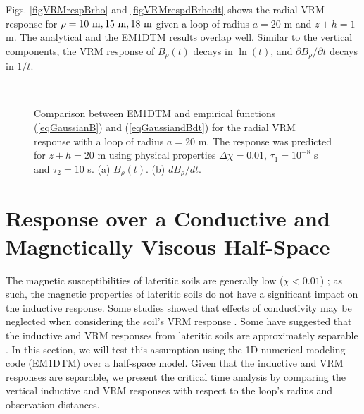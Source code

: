 \documentclass[journal]{IEEEtran}  %
\begin{document}
Figs. \ref{figVRMrespBrho} and
\ref{figVRMrespdBrhodt} shows the radial VRM response for $\rho = 10
~{\rm m}, 15 ~{\rm m}, 18 ~{\rm m}$ given a loop of radius $a=20$ m
and $z+h = 1$ m. The analytical and the EM1DTM results overlap well.
Similar to the vertical components, the VRM response of $B_\rho (t)$
decays in $\ln (t)$, and $\partial B_\rho /
\partial t$ decays in $1/t$.
\begin{figure}[!t]
    \centering
    \\
    \vspace{-10pt}
    \caption{Comparison between EM1DTM and
    empirical functions (\ref{eqGaussianB}) and (\ref{eqGaussiandBdt})
    for the radial VRM response with a loop of radius $a=20$ m.
    The response was predicted for $z+h =20$ m using physical properties
    $\Delta \chi = 0.01$, $\tau_1 =10^{-8}$ s and $\tau_2 =10$ s. (a) $B_\rho (t)$. (b) $dB_\rho /dt$.}
\label{figVRMrespRadial}
\vspace{-10pt}
\end{figure}
%


\section{Response over a Conductive and Magnetically Viscous Half-Space}

The magnetic susceptibilities of lateritic soils are
generally low ($\chi < 0.01$)
\cite{vanDam2004,vanDam2005,Dryuts2009}; as such, the magnetic
properties of lateritic soils do not have a significant impact on
the inductive response. Some studies showed that effects of
conductivity may be neglected when considering the soil's VRM
response \cite{Billings2003,Dryuts2009,Das2006}. Some have suggested that
the inductive and VRM responses from lateritic soils are
approximately separable \cite{Pasion2007,Buselli1982,Das2006}. In
this section, we will test this assumption using the 1D numerical modeling
code (EM1DTM) \cite{EM1DTM} over a half-space model. Given that the
inductive and VRM responses are separable, we present the critical
time analysis by comparing the vertical inductive and VRM responses
with respect to the loop's radius and observation distances.
\end{document}
